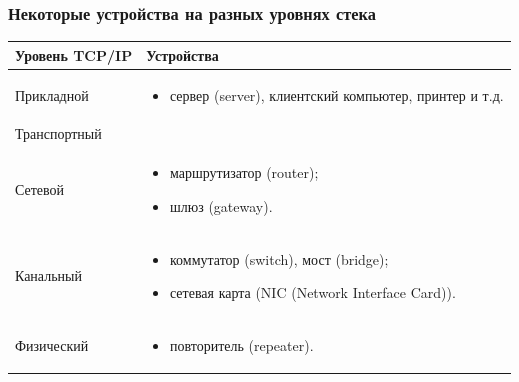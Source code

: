 \begin{frame}
    \frametitle{Некоторые устройства на разных уровнях стека}
        
    \begin{table}
        \centering
        \begin{tabular}{|l|l|}
            \hline\hline
            Уровень TCP/IP              & Устройства\\
            \hline\hline
            Прикладной
                & 
                \parbox{0.6\textwidth}{
                    \begin{itemize}
                        \item сервер (server), клиентский компьютер, принтер и т.д. 
                    \end{itemize}
                }
                    \\ \hline            
            Транспортный   & \\ \hline            
            Сетевой
                & 
                \parbox{0.5\textwidth}{
                    \begin{itemize}
                        \item маршрутизатор (router);
                        \item шлюз (gateway).
                    \end{itemize}
                }
                    \\ \hline
            Канальный
                &
                \parbox{0.7\textwidth}{
                    \begin{itemize}
                        \item коммутатор (switch), мост (bridge);
                        \item сетевая карта (NIC (Network Interface Card)).
                    \end{itemize}
                }
                    \\ \hline            
            Физический 
                &
                \parbox{0.6\textwidth}{
                    \begin{itemize}
                        \item повторитель (repeater).
                    \end{itemize}
                }
            \\ \hline
        \end{tabular}
    \end{table}
\end{frame}


